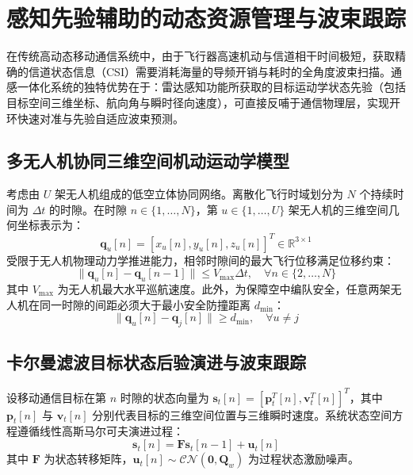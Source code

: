 \section{感知先验辅助的动态资源管理与波束跟踪}
\label{sec:sensing_assisted_comm}

在传统高动态移动通信系统中，由于飞行器高速机动与信道相干时间极短，获取精确的信道状态信息（CSI）需要消耗海量的导频开销与耗时的全角度波束扫描。通感一体化系统的独特优势在于：雷达感知功能所获取的目标运动学状态先验（包括目标空间三维坐标、航向角与瞬时径向速度），可直接反哺于通信物理层，实现开环快速对准与先验自适应波束预测。

\subsection{多无人机协同三维空间机动运动学模型}
考虑由 $U$ 架无人机组成的低空立体协同网络。离散化飞行时域划分为 $N$ 个持续时间为 $\Delta t$ 的时隙。在时隙 $n \in \{1, \dots, N\}$，第 $u \in \{1, \dots, U\}$ 架无人机的三维空间几何坐标表示为：
\begin{equation}
  \mathbf{q}_u[n] = [x_u[n], y_u[n], z_u[n]]^T \in \mathbb{R}^{3 \times 1}
\end{equation}
受限于无人机物理动力学推进能力，相邻时隙间的最大飞行位移满足位移约束：
\begin{equation}
  \|\mathbf{q}_u[n] - \mathbf{q}_u[n-1]\| \le V_{\max} \Delta t, \quad \forall n \in \{2, \dots, N\}
\end{equation}
其中 $V_{\max}$ 为无人机最大水平巡航速度。此外，为保障空中编队安全，任意两架无人机在同一时隙的间距必须大于最小安全防撞距离 $d_{\min}$：
\begin{equation}
  \|\mathbf{q}_u[n] - \mathbf{q}_j[n]\| \ge d_{\min}, \quad \forall u \ne j
\end{equation}

\subsection{卡尔曼滤波目标状态后验演进与波束跟踪}
设移动通信目标在第 $n$ 时隙的状态向量为 $\mathbf{s}_t[n] = [\mathbf{p}_t^T[n], \mathbf{v}_t^T[n]]^T$，其中 $\mathbf{p}_t[n]$ 与 $\mathbf{v}_t[n]$ 分别代表目标的三维空间位置与三维瞬时速度。系统状态空间方程遵循线性高斯马尔可夫演进过程：
\begin{equation}
  \mathbf{s}_t[n] = \mathbf{F} \mathbf{s}_t[n-1] + \mathbf{u}_t[n]
\end{equation}
其中 $\mathbf{F}$ 为状态转移矩阵，$\mathbf{u}_t[n] \sim \mathcal{CN}(\mathbf{0}, \mathbf{Q}_w)$ 为过程状态激励噪声。

